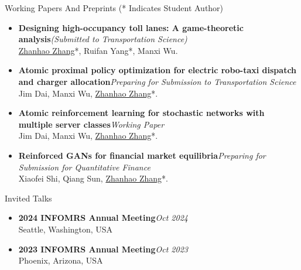 \documentclass{resume} %
\begin{document}
\begin{rSection}{Working Papers And Preprints ({* Indicates Student Author})}
\begin{itemize}
\item {\bf Designing high-occupancy toll lanes: A game-theoretic analysis}\hfill {\em (Submitted to Transportation Science)}\\
\underline{Zhanhao Zhang}*, Ruifan Yang*, Manxi Wu.
\item {\bf Atomic proximal policy optimization for electric robo-taxi dispatch and charger allocation}\hfill {\em Preparing for Submission to Transportation Science}\\
Jim Dai, Manxi Wu, \underline{Zhanhao Zhang}*.
\item {\bf Atomic reinforcement learning for stochastic networks with multiple server classes}\hfill {\em Working Paper}\\
Jim Dai, Manxi Wu, \underline{Zhanhao Zhang}*.
\item {\bf Reinforced GANs for financial market equilibria}\hfill {\em Preparing for Submission for Quantitative Finance}\\
Xiaofei Shi, Qiang Sun, \underline{Zhanhao Zhang}*.
\end{itemize}
\end{rSection}


\begin{rSection}{Invited Talks}
\begin{itemize}
\item {\bf 2024 INFOMRS Annual Meeting}\hfill {\em Oct 2024}\\
Seattle, Washington, USA
\item {\bf 2023 INFOMRS Annual Meeting}\hfill {\em Oct 2023}\\
Phoenix, Arizona, USA
\end{itemize}
\end{rSection}
\end{document}
